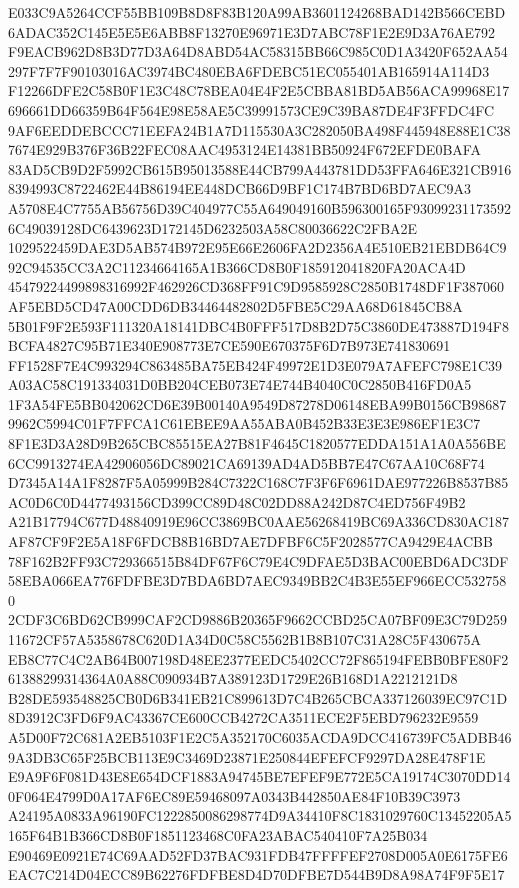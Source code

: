 \documentclass[UTF8,fontset=fandol,zihao=-4,a4paper]{ctexart}
\begin{document}
{{E033C9A5264CCF55BB109B8D8F83B120A99AB3601124268BAD142B566CEBD6ADAC352C145E5E5E6ABB8F13270E96971E3D7ABC78F1E2E9D3A76AE792
F9EACB962D8B3D77D3A64D8ABD54AC58315BB66C985C0D1A3420F652AA54297F7F7F90103016AC3974BC480EBA6FDEBC51EC055401AB165914A114D3
F12266DFE2C58B0F1E3C48C78BEA04E4F2E5CBBA81BD5AB56ACA99968E17696661DD66359B64F564E98E58AE5C39991573CE9C39BA87DE4F3FFDC4FC
9AF6EEDDEBCCC71EEFA24B1A7D115530A3C282050BA498F445948E88E1C387674E929B376F36B22FEC08AAC4953124E14381BB50924F672EFDE0BAFA
83AD5CB9D2F5992CB615B95013588E44CB799A443781DD53FFA646E321CB9168394993C8722462E44B86194EE448DCB66D9BF1C174B7BD6BD7AEC9A3
A5708E4C7755AB56756D39C404977C55A649049160B596300165F930992311735926C49039128DC6439623D172145D6232503A58C80036622C2FBA2E
1029522459DAE3D5AB574B972E95E66E2606FA2D2356A4E510EB21EBDB64C992C94535CC3A2C11234664165A1B366CD8B0F185912041820FA20ACA4D
45479224499898316992F462926CD368FF91C9D9585928C2850B1748DF1F387060AF5EBD5CD47A00CDD6DB34464482802D5FBE5C29AA68D61845CB8A
5B01F9F2E593F111320A18141DBC4B0FFF517D8B2D75C3860DE473887D194F8BCFA4827C95B71E340E908773E7CE590E670375F6D7B973E741830691
FF1528F7E4C993294C863485BA75EB424F49972E1D3E079A7AFEFC798E1C39A03AC58C191334031D0BB204CEB073E74E744B4040C0C2850B416FD0A5
1F3A54FE5BB042062CD6E39B00140A9549D87278D06148EBA99B0156CB986879962C5994C01F7FFCA1C61EBEE9AA55ABA0B452B33E3E3E986EF1E3C7
8F1E3D3A28D9B265CBC85515EA27B81F4645C1820577EDDA151A1A0A556BE6CC9913274EA42906056DC89021CA69139AD4AD5BB7E47C67AA10C68F74
D7345A14A1F8287F5A05999B284C7322C168C7F3F6F6961DAE977226B8537B85AC0D6C0D4477493156CD399CC89D48C02DD88A242D87C4ED756F49B2
A21B17794C677D48840919E96CC3869BC0AAE56268419BC69A336CD830AC187AF87CF9F2E5A18F6FDCB8B16BD7AE7DFBF6C5F2028577CA9429E4ACBB
78F162B2FF93C729366515B84DF67F6C79E4C9DFAE5D3BAC00EBD6ADC3DF58EBA066EA776FDFBE3D7BDA6BD7AEC9349BB2C4B3E55EF966ECC5327580
2CDF3C6BD62CB999CAF2CD9886B20365F9662CCBD25CA07BF09E3C79D25911672CF57A5358678C620D1A34D0C58C5562B1B8B107C31A28C5F430675A
EB8C77C4C2AB64B007198D48EE2377EEDC5402CC72F865194FEBB0BFE80F261388299314364A0A88C090934B7A389123D1729E26B168D1A2212121D8
B28DE593548825CB0D6B341EB21C899613D7C4B265CBCA337126039EC97C1D8D3912C3FD6F9AC43367CE600CCB4272CA3511ECE2F5EBD796232E9559
A5D00F72C681A2EB5103F1E2C5A352170C6035ACDA9DCC416739FC5ADBB469A3DB3C65F25BCB113E9C3469D23871E250844EFEFCF9297DA28E478F1E
E9A9F6F081D43E8E654DCF1883A94745BE7EFEF9E772E5CA19174C3070DD140F064E4799D0A17AF6EC89E59468097A0343B442850AE84F10B39C3973
A24195A0833A96190FC1222850086298774D9A34410F8C1831029760C13452205A5165F64B1B366CD8B0F1851123468C0FA23ABAC540410F7A25B034
E90469E0921E74C69AAD52FD37BAC931FDB47FFFFEF2708D005A0E6175FE6EAC7C214D04ECC89B62276FDFBE8D4D70DFBE7D544B9D8A98A74F9F5E17
}}
\end{document}
